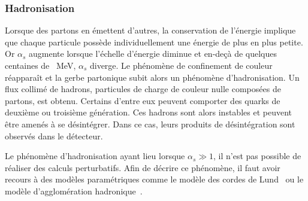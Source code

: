 \subsubsection{Hadronisation}\label{chapter-MSSM-formation_jets-subsec-hadronisation}
Lorsque des partons en émettent d'autres, la conservation de l'énergie implique que chaque particule possède individuellement une énergie de plus en plus petite.
Or $\alpha_s$ augmente lorsque l'échelle d'énergie diminue et en-deçà de quelques centaines de \SI{}{\MeV}, $\alpha_s$ diverge.
Le phénomène de confinement de couleur réapparaît et la gerbe partonique subit alors un phénomène d'hadronisation.
Un flux collimé de hadrons, particules de charge de couleur nulle composées de partons, est obtenu.
Certains d'entre eux peuvent comporter des quarks de deuxième ou troisième génération. Ces hadrons sont alors instables et peuvent être amenés à se désintégrer.
Dans ce cas, leurs produits de désintégration sont observés dans le détecteur.
\par Le phénomène d'hadronisation ayant lieu lorsque $\alpha_s\gg1$, il n'est pas possible de réaliser des calculs perturbatifs. Afin de décrire ce phénomène, il faut avoir recours à des modèles paramétriques comme
le modèle des cordes de Lund~\cite{Andersson_parton_fragmentation}
ou
le modèle d'agglomération hadronique~\cite{Winter_2004}.
